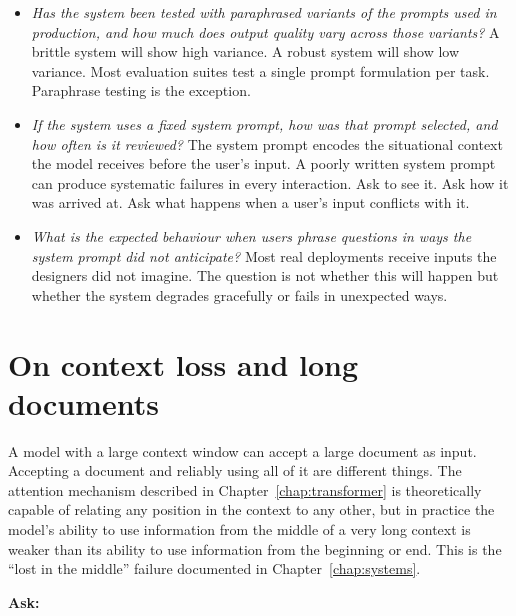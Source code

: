 \begin{itemize}
  \item \emph{Has the system been tested with paraphrased
        variants of the prompts used in production, and
        how much does output quality vary across those
        variants?} A brittle system will show high variance.
        A robust system will show low variance. Most
        evaluation suites test a single prompt formulation
        per task. Paraphrase testing is the exception.

  \item \emph{If the system uses a fixed system prompt,
        how was that prompt selected, and how often is
        it reviewed?} The system prompt encodes the
        situational context the model receives before the
        user's input. A poorly written system prompt can
        produce systematic failures in every interaction.
        Ask to see it. Ask how it was arrived at. Ask
        what happens when a user's input conflicts with it.

  \item \emph{What is the expected behaviour when users
        phrase questions in ways the system prompt did
        not anticipate?} Most real deployments receive
        inputs the designers did not imagine. The
        question is not whether this will happen but
        whether the system degrades gracefully or fails
        in unexpected ways.
\end{itemize}

\section{On context loss and long documents}

A model with a large context window can accept a large
document as input. Accepting a document and reliably using
all of it are different things. The attention mechanism
described in Chapter~\ref{chap:transformer} is theoretically capable of relating
any position in the context to any other, but in practice
the model's ability to use information from the middle of
a very long context is weaker than its ability to use
information from the beginning or end. This is the
``lost in the middle'' failure documented in Chapter~\ref{chap:systems}.

\medskip
\noindent\textbf{Ask:}

